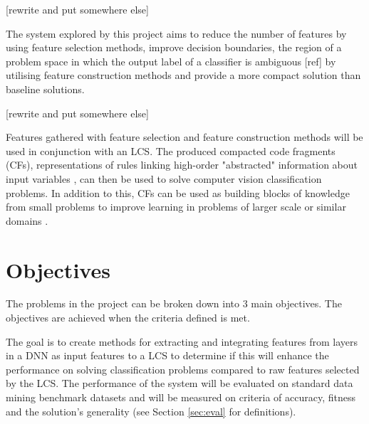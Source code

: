 [rewrite and put somewhere else]

The system explored by this project aims to reduce the number of features by using feature selection methods, improve decision boundaries, the region of a problem space in which the output label of a classifier is ambiguous [ref] by utilising feature construction methods and provide a more compact solution than baseline solutions. 

[rewrite and put somewhere else]

Features gathered with feature selection and feature construction methods will be used in conjunction with an LCS. The produced compacted code fragments (CFs), representations of rules linking high-order "abstracted" information about input variables \cite{urbanowicz2017introduction}, can then be used to solve computer vision classification problems. In addition to this, CFs can be used as building blocks of knowledge from small problems to improve learning in problems of larger scale or similar domains \cite{urbanowicz2017introduction}. 

\section{Objectives} \label{subsec:obj}
The problems in the project can be broken down into 3 main objectives. The objectives are achieved when the criteria defined is met.

The goal is to create methods for extracting and integrating features from layers in a DNN as input features to a LCS to determine if this will enhance the performance on solving classification problems compared to raw features selected by the LCS. The performance of the system will be evaluated on standard data mining benchmark datasets and will be measured on criteria of accuracy, fitness and the solution's generality (see Section \ref{sec:eval} for definitions).
 

